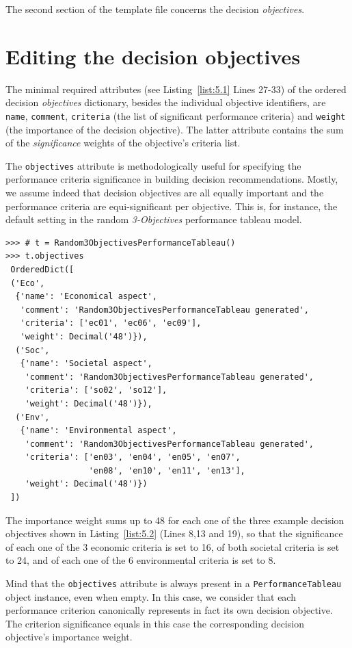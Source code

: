 The second section of the template file concerns the decision \emph{objectives}.

\section{Editing the decision objectives}
\label{sec:5.3}

The minimal required attributes (see Listing~\vref{list:5.1} Lines 27-33) of the ordered decision \emph{objectives} dictionary, besides the individual objective identifiers, are \texttt{name}, \texttt{comment}, \texttt{criteria} (the list of significant performance criteria) and \texttt{weight} (the importance of the decision objective). The latter attribute contains the sum of the \emph{significance} weights of the objective's criteria list. 

The \texttt{objectives} attribute is methodologically useful for specifying the performance criteria significance in building decision recommendations. Mostly, we assume indeed that decision objectives are all equally important and the performance criteria are equi-significant per objective. This is, for instance, the default setting in the random \emph{3-Objectives} performance tableau model.

\begin{lstlisting}[caption={Example of decision objectives' description},label=list:5.2]
>>> # t = Random3ObjectivesPerformanceTableau()
>>> t.objectives
 OrderedDict([
 ('Eco',
  {'name': 'Economical aspect',
   'comment': 'Random3ObjectivesPerformanceTableau generated',
   'criteria': ['ec01', 'ec06', 'ec09'],
   'weight': Decimal('48')}),
  ('Soc',
   {'name': 'Societal aspect',
    'comment': 'Random3ObjectivesPerformanceTableau generated',
    'criteria': ['so02', 'so12'],
    'weight': Decimal('48')}),
  ('Env',
   {'name': 'Environmental aspect',
    'comment': 'Random3ObjectivesPerformanceTableau generated',
    'criteria': ['en03', 'en04', 'en05', 'en07',
                 'en08', 'en10', 'en11', 'en13'],
    'weight': Decimal('48')})
 ])
\end{lstlisting}

The importance weight sums up to 48 for each one of the three example decision objectives shown in Listing~\vref{list:5.2} (Lines 8,13 and 19), so that the significance of each one of the 3 economic criteria is set to 16, of both societal criteria is set to 24, and of each one of the 6 environmental criteria is set to 8.

Mind that the \texttt{objectives} attribute is always present in a \texttt{PerformanceTableau} object instance, even when empty. In this case, we consider that each performance criterion canonically represents in fact its own decision objective. The criterion significance equals in this case the corresponding decision objective's importance weight.

